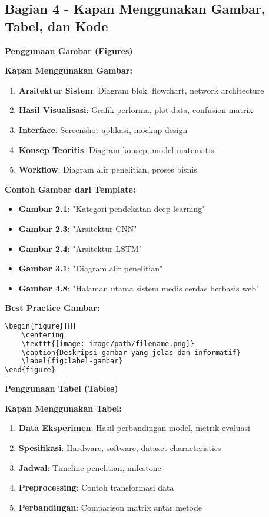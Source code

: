 \subsection*{Bagian 4 - Kapan Menggunakan Gambar, Tabel, dan Kode}

\textbf{Penggunaan Gambar (Figures)}

\textbf{Kapan Menggunakan Gambar:}
\begin{enumerate}
    \item \textbf{Arsitektur Sistem}: Diagram blok, flowchart, network architecture
    \item \textbf{Hasil Visualisasi}: Grafik performa, plot data, confusion matrix
    \item \textbf{Interface}: Screenshot aplikasi, mockup design
    \item \textbf{Konsep Teoritis}: Diagram konsep, model matematis
    \item \textbf{Workflow}: Diagram alir penelitian, proses bisnis
\end{enumerate}

\textbf{Contoh Gambar dari Template:}
\begin{itemize}
    \item \textbf{Gambar 2.1}: "Kategori pendekatan deep learning"
    \item \textbf{Gambar 2.3}: "Arsitektur CNN"
    \item \textbf{Gambar 2.4}: "Arsitektur LSTM"
    \item \textbf{Gambar 3.1}: "Diagram alir penelitian"
    \item \textbf{Gambar 4.8}: "Halaman utama sistem medis cerdas berbasis web"
\end{itemize}

\textbf{Best Practice Gambar:}
\begin{lstlisting}[language=bash, style=bash, caption=Format Gambar dalam LaTeX]
\begin{figure}[H]
    \centering
    \texttt{[image: image/path/filename.png]}
    \caption{Deskripsi gambar yang jelas dan informatif}
    \label{fig:label-gambar}
\end{figure}
\end{lstlisting}

\textbf{Penggunaan Tabel (Tables)}

\textbf{Kapan Menggunakan Tabel:}
\begin{enumerate}
    \item \textbf{Data Eksperimen}: Hasil perbandingan model, metrik evaluasi
    \item \textbf{Spesifikasi}: Hardware, software, dataset characteristics
    \item \textbf{Jadwal}: Timeline penelitian, milestone
    \item \textbf{Preprocessing}: Contoh transformasi data
    \item \textbf{Perbandingan}: Comparison matrix antar metode
\end{enumerate}

